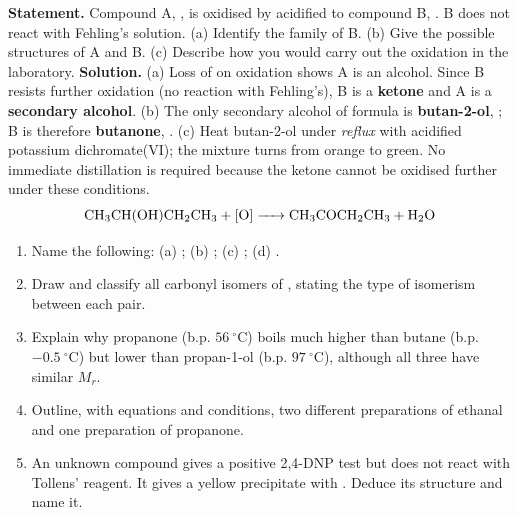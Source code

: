 \documentclass[11pt]{article}
\begin{document}
\begin{exoresolu}
\textbf{Statement.} Compound A, , is oxidised by acidified  to compound B, . B does not react with Fehling's solution. (a) Identify the family of B. (b) Give the possible structures of A and B. (c) Describe how you would carry out the oxidation in the laboratory.
\tcblower
\textbf{Solution.} (a) Loss of  on oxidation shows A is an alcohol. Since B resists further oxidation (no reaction with Fehling's), B is a \textbf{ketone} and A is a \textbf{secondary alcohol}.
(b) The only secondary alcohol of formula  is \textbf{butan-2-ol}, ; B is therefore \textbf{butanone}, .
(c) Heat butan-2-ol under \emph{reflux} with acidified potassium dichromate(VI); the mixture turns from orange to green. No immediate distillation is required because the ketone cannot be oxidised further under these conditions.
\[ \ce{CH3CH(OH)CH2CH3 + [O] -> CH3COCH2CH3 + H2O} \]
\end{exoresolu}

\begin{exercice}
\begin{enumerate}
\item Name the following: (a) ; (b) ; (c) ; (d) .
\item Draw and classify all carbonyl isomers of , stating the type of isomerism between each pair.
\item Explain why propanone (b.p. $56\ ^\circ$C) boils much higher than butane (b.p. $-0.5\ ^\circ$C) but lower than propan-1-ol (b.p. $97\ ^\circ$C), although all three have similar $M_r$.
\item Outline, with equations and conditions, two different preparations of ethanal and one preparation of propanone.
\item An unknown compound  gives a positive 2,4-DNP test but does not react with Tollens' reagent. It gives a yellow precipitate with . Deduce its structure and name it.
\end{enumerate}
\end{exercice}
\end{document}
